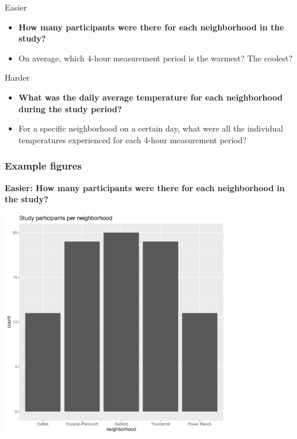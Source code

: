 \documentclass[
  letterpaper,
  DIV=11,
  numbers=noendperiod]{scrreprt}
\providecommand{\tightlist}{%
  \setlength{\itemsep}{0pt}\setlength{\parskip}{0pt}}\usepackage{longtable,booktabs,array}
\begin{document}
\begin{tcolorbox}
Easier

\begin{itemize}
\tightlist
\item
  \textbf{How many participants were there for each neighborhood in the
  study?}
\item
  On average, which 4-hour measurement period is the warmest? The
  coolest?
\end{itemize}

Harder

\begin{itemize}
\tightlist
\item
  \textbf{What was the daily average temperature for each neighborhood
  during the study period?}
\item
  For a specific neighborhood on a certain day, what were all the
  individual temperatures experienced for each 4-hour measurement
  period?
\end{itemize}

\subsubsection{Example figures}

\textbf{Easier: How many participants were there for each neighborhood
in the study?}

\includegraphics[width=0.75\textwidth,height=\textheight]{scripts/04_projects/project-day-2_files/figs/temps-easy.png}


\end{tcolorbox}
\end{document}
